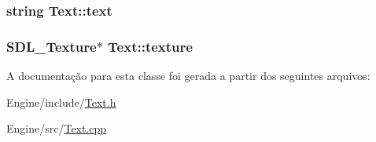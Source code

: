 \hypertarget{classText_a7da8331e2da684bb0485a3ee7893b415}{
\subsubsection[{text}]{\setlength{\rightskip}{0pt plus 5cm}string Text\+::text\hspace{0.3cm}{\ttfamily [private]}}}\label{classText_a7da8331e2da684bb0485a3ee7893b415}
\hypertarget{classText_aea2a82ef1d8b4d448b6b3e524bce2cc2}{
\subsubsection[{texture}]{\setlength{\rightskip}{0pt plus 5cm}S\+D\+L\+\_\+\+Texture$\ast$ Text\+::texture\hspace{0.3cm}{\ttfamily [private]}}}\label{classText_aea2a82ef1d8b4d448b6b3e524bce2cc2}


A documentação para esta classe foi gerada a partir dos seguintes arquivos\+:\begin{DoxyCompactItemize}
\item 
Engine/include/\hyperlink{Text_8h}{Text.\+h}\item 
Engine/src/\hyperlink{Text_8cpp}{Text.\+cpp}\end{DoxyCompactItemize}
